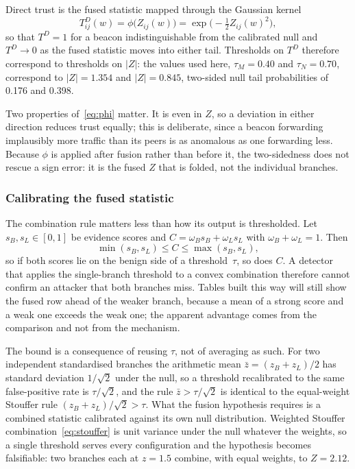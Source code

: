 Direct trust is the fused statistic mapped through the Gaussian kernel
\begin{equation}
\label{eq:phi}
T^D_{ij}(w) = \phi\bigl(Z_{ij}(w)\bigr) = \exp\bigl(-\tfrac12 Z_{ij}(w)^2\bigr),
\end{equation}
so that $T^D = 1$ for a beacon indistinguishable from the calibrated null and
$T^D \to 0$ as the fused statistic moves into either tail. Thresholds on $T^D$
therefore correspond to thresholds on $|Z|$: the values used here,
$\tau_M = 0.40$ and $\tau_N = 0.70$, correspond to $|Z| = 1.354$ and
$|Z| = 0.845$, two-sided null tail probabilities of 0.176 and 0.398.

Two properties of~\eqref{eq:phi} matter. It is even in $Z$, so a deviation in
either direction reduces trust equally; this is deliberate, since a beacon
forwarding implausibly more traffic than its peers is as anomalous as one
forwarding less. Because $\phi$ is applied after fusion rather than before
it, the two-sidedness does not rescue a sign error: it is the fused $Z$ that is
folded, not the individual branches.

\subsubsection{Calibrating the fused statistic}
\label{sec:calib}

The combination rule matters less than how its output is thresholded. Let
$s_B, s_L \in [0,1]$ be evidence scores and $C = \omega_B s_B + \omega_L s_L$
with $\omega_B + \omega_L = 1$. Then
\begin{equation}
\label{eq:convex}
\min(s_B, s_L) \le C \le \max(s_B, s_L),
\end{equation}
so if both scores lie on the benign side of a threshold~$\tau$, so does $C$. A
detector that applies the single-branch threshold to a convex combination
therefore cannot confirm an attacker that both branches miss. Tables built
this way will still show the fused row ahead of the weaker branch, because a
mean of a strong score and a weak one exceeds the weak one; the apparent
advantage comes from the comparison and not from the mechanism.

The bound is a consequence of reusing $\tau$, not of averaging as such. For two
independent standardised branches the arithmetic mean
$\bar z = (z_B + z_L)/2$ has standard deviation $1/\sqrt2$ under the null, so a
threshold recalibrated to the same false-positive rate is $\tau/\sqrt2$, and
the rule $\bar z > \tau/\sqrt2$ is identical to the equal-weight Stouffer rule
$(z_B + z_L)/\sqrt2 > \tau$. What the fusion hypothesis requires is a combined
statistic calibrated against its own null distribution. Weighted Stouffer
combination~\eqref{eq:stouffer} is unit variance under the null whatever the
weights, so a single threshold serves every configuration and the hypothesis
becomes falsifiable: two branches each at $z = 1.5$ combine, with equal
weights, to $Z = 2.12$.

